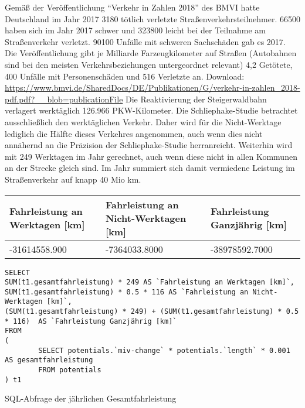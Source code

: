 \documentclass[fontsize=12pt,a4paper]{scrreprt}
\begin{document}
Gemäß der Veröffentlichung \enquote{Verkehr in Zahlen 2018} des BMVI hatte Deutschland im Jahr 2017 3180 tötlich verletzte Straßenverkehrsteilnehmer.
66500 haben sich im Jahr 2017 schwer und 323800 leicht bei der Teilnahme am Straßenverkehr verletzt. 90100 Unfälle mit schweren Sachschäden gab es 2017.
Die Veröffentlichung gibt je Milliarde Farzeugkilometer auf Straßen (Autobahnen sind bei den meisten Verkehrsbeziehungen untergeordnet relevant) 4,2 Getötete, 400 Unfälle mit Personenschäden und 516 Verletzte an.
Download: \url{https://www.bmvi.de/SharedDocs/DE/Publikationen/G/verkehr-in-zahlen_2018-pdf.pdf?__blob=publicationFile}
\newline
\newline
Die Reaktivierung der Steigerwaldbahn verlagert werktäglich 126.966 PKW-Kilometer. Die Schliephake-Studie betrachtet ausschließlich den werktäglichen Verkehr. Daher wird für die Nicht-Werktage lediglich die Hälfte dieses Verkehres angenommen, auch wenn dies nicht annähernd an die Präzision der Schliephake-Studie herranreicht. Weiterhin wird mit 249 Werktagen im Jahr gerechnet, auch wenn diese nicht in allen Kommunen an der Strecke gleich sind.
\newline
\newline
Im Jahr summiert sich damit vermiedene Leistung im Straßenverkehr auf knapp 40 Mio km.
\newline
\newline
\begin{tabular}{|l | l | l |}
        \hline
        Fahrleistung an Werktagen [km] & Fahrleistung an Nicht-Werktagen [km] & Fahrleistung Ganzjährig [km]\\ 
        \hline
        -31614558.900 & -7364033.8000 & -38978592.7000\\ 
        \hline
\end{tabular}
\newline
\newline
\begin{listing}[htbp]
\begin{verbatim}
SELECT
SUM(t1.gesamtfahrleistung) * 249 AS `Fahrleistung an Werktagen [km]`, 
SUM(t1.gesamtfahrleistung) * 0.5 * 116 AS `Fahrleistung an Nicht-Werktagen [km]`, 
(SUM(t1.gesamtfahrleistung) * 249) + (SUM(t1.gesamtfahrleistung) * 0.5 * 116)  AS `Fahrleistung Ganzjährig [km]`
FROM
(
        SELECT potentials.`miv-change` * potentials.`length` * 0.001 AS gesamtfahrleistung
        FROM potentials
) t1
\end{verbatim}
\caption{SQL-Abfrage der jährlichen Gesamtfahrleistung}\label{lst-gesamtfahrleistung-jaehrlich}
\end{listing}
\end{document}
